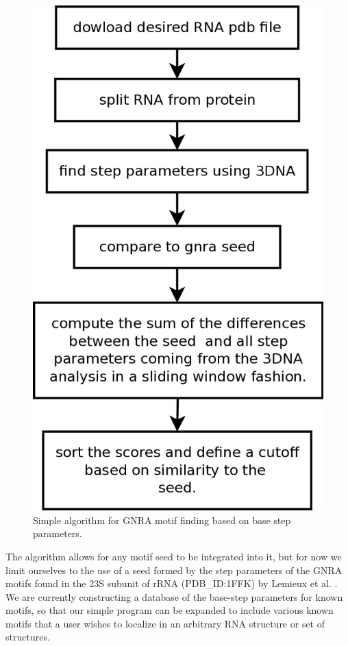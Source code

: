 \begin{figure}[ht]
\centering
\includegraphics[angle=0, scale=0.4]{Chapter5/getMotif.png}
\caption{Simple algorithm  for GNRA motif  finding based on  base step
  parameters.}
\label{fig:getMotif}
\end{figure}
  
The algorithm allows for any motif  seed to be integrated into it, but
for now  we limit ourselves to  the use of  a seed formed by  the step
parameters  of  the GNRA  motifs  found in  the  23S  subunit of  rRNA
(PDB\_ID:1FFK)  by   Lemieux  et  al.    \cite{lemieux2006}.   We  are
currently  constructing a  database  of the  base-step parameters  for
known motifs,  so that our simple  program can be  expanded to include
various known  motifs that a user  wishes to localize  in an arbitrary
RNA structure or set of structures.

